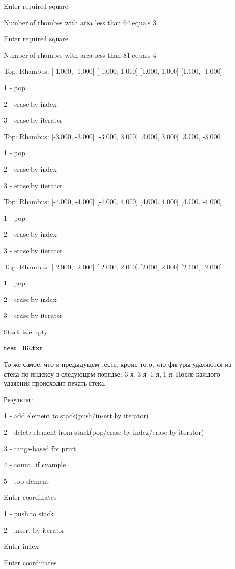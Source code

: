 \documentclass[a4paper, 12pt]{article}
\begin{document}
Enter required square

Number of rhombes with area less than 64 equals 3

Enter required square

Number of rhombes with area less than 81 equals 4

Top: Rhombus: [-1.000, -1.000] [-1.000, 1.000] [1.000, 1.000] [1.000, -1.000] 

1 - pop

2 - erase by index

3 - erase by iterator

Top: Rhombus: [-3.000, -3.000] [-3.000, 3.000] [3.000, 3.000] [3.000, -3.000] 

1 - pop

2 - erase by index

3 - erase by iterator

Top: Rhombus: [-4.000, -4.000] [-4.000, 4.000] [4.000, 4.000] [4.000, -4.000] 

1 - pop

2 - erase by index

3 - erase by iterator

Top: Rhombus: [-2.000, -2.000] [-2.000, 2.000] [2.000, 2.000] [2.000, -2.000] 

1 - pop

2 - erase by index

3 - erase by iterator

Stack is empty

\vspace{3ex}

\textbf{test\_03.txt} 

То же самое, что и предыдущем тесте, кроме того, что фигуры удаляются из стека по индексу в следующем порядке: 3-я, 3-я, 1-я, 1-я. После каждого удаления происходит печать стека.

Результат:

1 - add element to stack(push/insert by iterator)

2 - delete element from stack(pop/erase by index/erase by iterator)

3 - range-based for print

4 - count\_if example

5 - top element

Enter coordinates

1 - push to stack

2 - insert by iterator

Enter index

Enter coordinates
\end{document}
